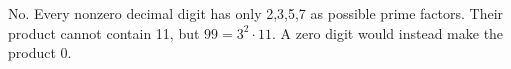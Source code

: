 No. Every nonzero decimal digit has only 2,3,5,7 as possible prime factors. Their product cannot contain 11, but $99=3^2\cdot11$. A zero digit would instead make the product 0.
